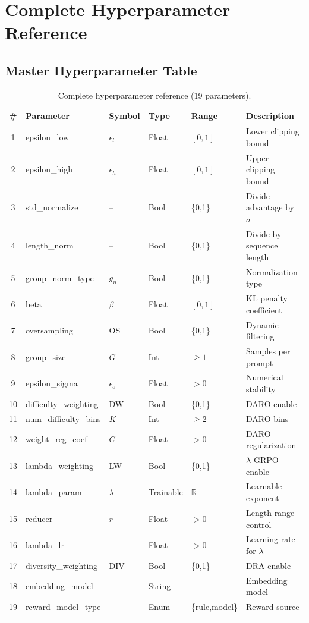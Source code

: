 \documentclass[11pt,a4paper]{article}
\begin{document}
\newpage


\section{Complete Hyperparameter Reference}

\subsection{Master Hyperparameter Table}

\begin{longtable}{@{}clllll@{}}
\toprule
\# & \textbf{Parameter} & \textbf{Symbol} & \textbf{Type} & \textbf{Range} & \textbf{Description} \\
\midrule
\endhead
1 & epsilon\_low & $\epsilon_l$ & Float & $[0,1]$ & Lower clipping bound \\
2 & epsilon\_high & $\epsilon_h$ & Float & $[0,1]$ & Upper clipping bound \\
3 & std\_normalize & -- & Bool & \{0,1\} & Divide advantage by $\sigma$ \\
4 & length\_norm & -- & Bool & \{0,1\} & Divide by sequence length \\
5 & group\_norm\_type & $g_n$ & Bool & \{0,1\} & Normalization type \\
6 & beta & $\beta$ & Float & $[0,1]$ & KL penalty coefficient \\
7 & oversampling & OS & Bool & \{0,1\} & Dynamic filtering \\
8 & group\_size & $G$ & Int & $\geq 1$ & Samples per prompt \\
9 & epsilon\_sigma & $\epsilon_\sigma$ & Float & $>0$ & Numerical stability \\
10 & difficulty\_weighting & DW & Bool & \{0,1\} & DARO enable \\
11 & num\_difficulty\_bins & $K$ & Int & $\geq 2$ & DARO bins \\
12 & weight\_reg\_coef & $C$ & Float & $>0$ & DARO regularization \\
13 & lambda\_weighting & LW & Bool & \{0,1\} & $\lambda$-GRPO enable \\
14 & lambda\_param & $\lambda$ & Trainable & $\mathbb{R}$ & Learnable exponent \\
15 & reducer & $r$ & Float & $>0$ & Length range control \\
16 & lambda\_lr & -- & Float & $>0$ & Learning rate for $\lambda$ \\
17 & diversity\_weighting & DIV & Bool & \{0,1\} & DRA enable \\
18 & embedding\_model & -- & String & -- & Embedding model \\
19 & reward\_model\_type & -- & Enum & \{rule,model\} & Reward source \\
\bottomrule
\caption{Complete hyperparameter reference (19 parameters).}
\end{longtable}
\end{document}

